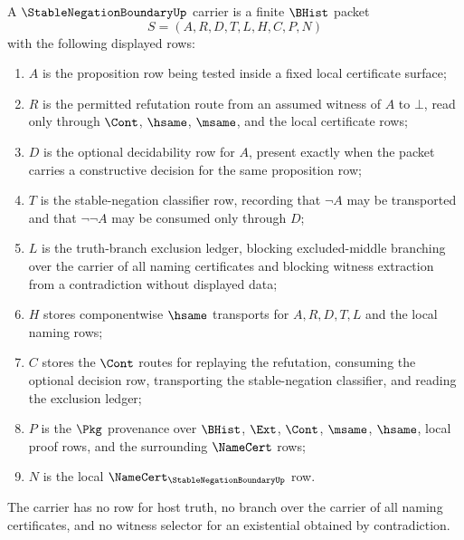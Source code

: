 \begin{definition}
\label{def:stable-negation-boundary-carrier}
A $\StableNegationBoundaryUp$ carrier is a finite $\BHist$ packet
$$
S=(A,R,D,T,L,H,C,P,N)
$$
with the following displayed rows:
\begin{enumerate}
\item $A$ is the proposition row being tested inside a fixed local certificate surface;
\item $R$ is the permitted refutation route from an assumed witness of $A$ to $\bot$, read only through $\Cont$, $\hsame$, $\msame$, and the local certificate rows;
\item $D$ is the optional decidability row for $A$, present exactly when the packet carries a constructive decision for the same proposition row;
\item $T$ is the stable-negation classifier row, recording that $\neg A$ may be transported and that $\neg\neg A$ may be consumed only through $D$;
\item $L$ is the truth-branch exclusion ledger, blocking excluded-middle branching over the carrier of all naming certificates and blocking witness extraction from a contradiction without displayed data;
\item $H$ stores componentwise $\hsame$ transports for $A,R,D,T,L$ and the local naming rows;
\item $C$ stores the $\Cont$ routes for replaying the refutation, consuming the optional decision row, transporting the stable-negation classifier, and reading the exclusion ledger;
\item $P$ is the $\Pkg$ provenance over $\BHist$, $\Ext$, $\Cont$, $\msame$, $\hsame$, local proof rows, and the surrounding $\NameCert$ rows;
\item $N$ is the local $\NameCert_{\StableNegationBoundaryUp}$ row.
\end{enumerate}
The carrier has no row for host truth, no branch over the carrier of all naming certificates, and no witness selector for an existential obtained by contradiction.
\end{definition}

